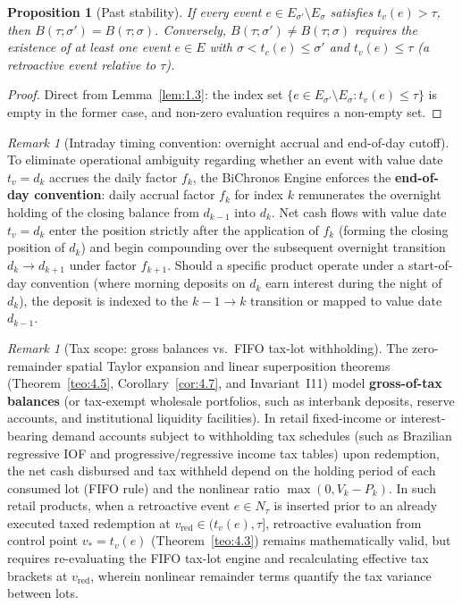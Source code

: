 \documentclass[11pt, a4paper]{article}
\theoremstyle{definition}
\theoremstyle{plain}
\newtheorem{proposicao}[definicao]{Proposition}
\theoremstyle{remark}
\newtheorem{observacao}[definicao]{Remark}
\begin{document}
\begin{proposicao}[Past stability]\label{prop:1.4}
If every event $e \in E_{\sigma'} \setminus E_\sigma$ satisfies $t_v(e) > \tau$, then $B(\tau; \sigma') = B(\tau; \sigma)$. Conversely, $B(\tau; \sigma') \neq B(\tau; \sigma)$ requires the existence of at least one event $e \in E$ with $\sigma < t_c(e) \le \sigma'$ and $t_v(e) \le \tau$ (a retroactive event relative to $\tau$).
\end{proposicao}
\begin{proof}
Direct from Lemma~\ref{lem:1.3}: the index set $\{e \in E_{\sigma'} \setminus E_\sigma : t_v(e) \le \tau\}$ is empty in the former case, and non-zero evaluation requires a non-empty set.
\end{proof}

\begin{observacao}[Intraday timing convention: overnight accrual and end-of-day cutoff]\label{obs:1.5}
To eliminate operational ambiguity regarding whether an event with value date $t_v = d_k$ accrues the daily factor $f_k$, the BiChronos Engine enforces the \textbf{end-of-day convention}: daily accrual factor $f_k$ for index $k$ remunerates the overnight holding of the closing balance from $d_{k-1}$ into $d_k$. Net cash flows with value date $t_v = d_k$ enter the position strictly after the application of $f_k$ (forming the closing position of $d_k$) and begin compounding over the subsequent overnight transition $d_k \to d_{k+1}$ under factor $f_{k+1}$. Should a specific product operate under a start-of-day convention (where morning deposits on $d_k$ earn interest during the night of $d_k$), the deposit is indexed to the $k-1 \to k$ transition or mapped to value date $d_{k-1}$.
\end{observacao}

\begin{observacao}[Tax scope: gross balances vs.\ FIFO tax-lot withholding]\label{obs:1.6}
The zero-remainder spatial Taylor expansion and linear superposition theorems (Theorem~\ref{teo:4.5}, Corollary~\ref{cor:4.7}, and Invariant~I11) model \textbf{gross-of-tax balances} (or tax-exempt wholesale portfolios, such as interbank deposits, reserve accounts, and institutional liquidity facilities). In retail fixed-income or interest-bearing demand accounts subject to withholding tax schedules (such as Brazilian regressive IOF and progressive/regressive income tax tables) upon redemption, the net cash disbursed and tax withheld depend on the holding period of each consumed lot (FIFO rule) and the nonlinear ratio $\max(0, V_k - P_k)$. In such retail products, when a retroactive event $e \in N_\tau$ is inserted prior to an already executed taxed redemption at $v_{\text{red}} \in (t_v(e), \tau]$, retroactive evaluation from control point $v_* = t_v(e)$ (Theorem~\ref{teo:4.3}) remains mathematically valid, but requires re-evaluating the FIFO tax-lot engine and recalculating effective tax brackets at $v_{\text{red}}$, wherein nonlinear remainder terms quantify the tax variance between lots.
\end{observacao}
\end{document}
